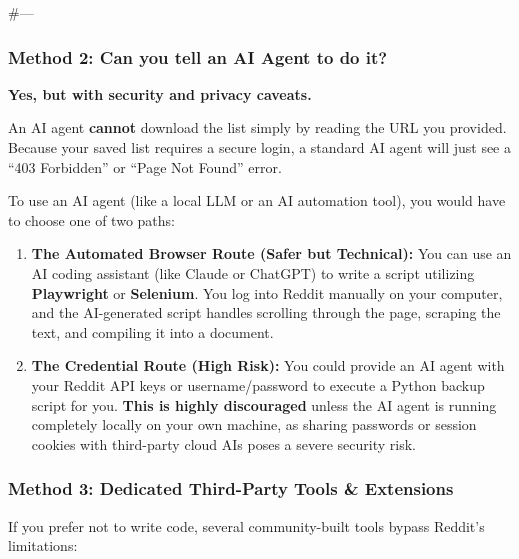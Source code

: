 \documentclass[
  letterpaper,
  DIV=11,
  numbers=noendperiod]{scrartcl}
\providecommand{\tightlist}{%
  \setlength{\itemsep}{0pt}\setlength{\parskip}{0pt}}\usepackage{longtable,booktabs,array}
\begin{document}
\#---

\subsubsection{Method 2: Can you tell an AI Agent to do
it?}\label{method-2-can-you-tell-an-ai-agent-to-do-it}

\textbf{Yes, but with security and privacy caveats.}

An AI agent \textbf{cannot} download the list simply by reading the URL
you provided. Because your saved list requires a secure login, a
standard AI agent will just see a ``403 Forbidden'' or ``Page Not
Found'' error.

To use an AI agent (like a local LLM or an AI automation tool), you
would have to choose one of two paths:

\begin{enumerate}
\def\labelenumi{\arabic{enumi}.}
\tightlist
\item
  \textbf{The Automated Browser Route (Safer but Technical):} You can
  use an AI coding assistant (like Claude or ChatGPT) to write a script
  utilizing \textbf{Playwright} or \textbf{Selenium}. You log into
  Reddit manually on your computer, and the AI-generated script handles
  scrolling through the page, scraping the text, and compiling it into a
  document.
\item
  \textbf{The Credential Route (High Risk):} You could provide an AI
  agent with your Reddit API keys or username/password to execute a
  Python backup script for you. \textbf{This is highly discouraged}
  unless the AI agent is running completely locally on your own machine,
  as sharing passwords or session cookies with third-party cloud AIs
  poses a severe security risk.
\end{enumerate}

\subsubsection{Method 3: Dedicated Third-Party Tools \&
Extensions}\label{method-3-dedicated-third-party-tools-extensions}

If you prefer not to write code, several community-built tools bypass
Reddit's limitations:
\end{document}
